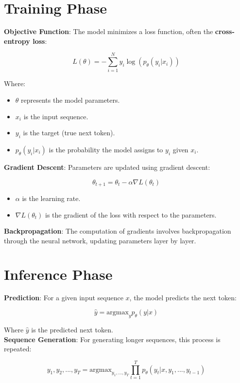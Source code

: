 \documentclass{article}
\begin{document}
\section*{Training Phase}

\textbf{Objective Function}: The model minimizes a loss function, often the \textbf{cross-entropy loss}:

\[
L(\theta) = -\sum_{i=1}^{N} y_i \log(p_{\theta}(y_i|x_i))
\]

Where:
\begin{itemize}
    \item \( \theta \) represents the model parameters.
    \item \( x_i \) is the input sequence.
    \item \( y_i \) is the target (true next token).
    \item \( p_{\theta}(y_i|x_i) \) is the probability the model assigns to \( y_i \) given \( x_i \).
\end{itemize}

\textbf{Gradient Descent}: Parameters are updated using gradient descent:

\[
\theta_{t+1} = \theta_t - \alpha \nabla L(\theta_t)
\]

\begin{itemize}
    \item \( \alpha \) is the learning rate.
    \item \( \nabla L(\theta_t) \) is the gradient of the loss with respect to the parameters.
\end{itemize}

\textbf{Backpropagation}: The computation of gradients involves backpropagation through the neural network, updating parameters layer by layer.

\section*{Inference Phase}

\textbf{Prediction}: For a given input sequence \( x \), the model predicts the next token:

\[
\hat{y} = \text{argmax}_y p_{\theta}(y|x)
\]

Where \( \hat{y} \) is the predicted next token.
\\
\textbf{Sequence Generation}: For generating longer sequences, this process is repeated:

\[
y_1, y_2, ..., y_T = \text{argmax}_{y_1, ..., y_T} \prod_{t=1}^{T} p_{\theta}(y_t|x, y_1, ..., y_{t-1})
\]
\end{document}
